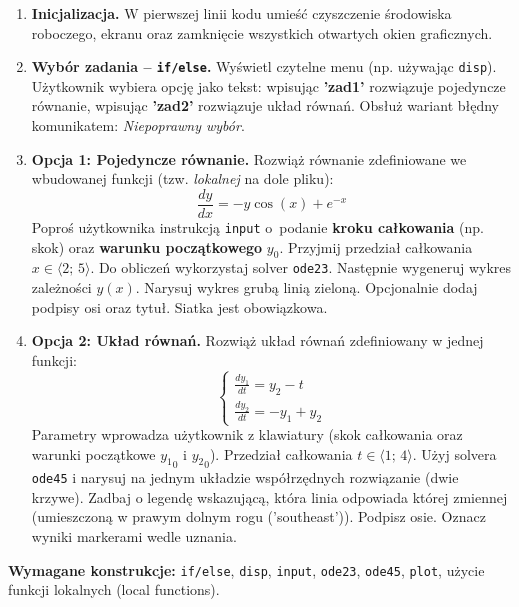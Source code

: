 \documentclass[a4paper,11pt]{article}
\begin{document}
\begin{enumerate}[leftmargin=*, label=\textbf{\arabic*.}, itemsep=2pt]

  \item \textbf{Inicjalizacja.}
    W pierwszej linii kodu umieść czyszczenie środowiska roboczego, ekranu oraz zamknięcie wszystkich otwartych okien graficznych.

  \item \textbf{Wybór zadania -- \texttt{if/else}.}
    Wyświetl czytelne menu (np. używając \texttt{disp}). Użytkownik wybiera opcję jako tekst: wpisując \textbf{'zad1'} rozwiązuje pojedyncze równanie, wpisując \textbf{'zad2'} rozwiązuje układ równań. Obsłuż wariant błędny komunikatem: \textit{Niepoprawny wybór}.

  \item \textbf{Opcja 1: Pojedyncze równanie.}
    Rozwiąż równanie zdefiniowane we wbudowanej funkcji (tzw. \textit{lokalnej} na dole pliku):
    \[ \frac{dy}{dx} = -y\cos(x) + e^{-x} \]
    Poproś użytkownika instrukcją \texttt{input} o~podanie \textbf{kroku całkowania} (np. skok) oraz \textbf{warunku początkowego} $y_0$. Przyjmij przedział całkowania $x \in \langle 2;\,5 \rangle$.
    Do obliczeń wykorzystaj solver \texttt{ode23}. Następnie wygeneruj wykres zależności $y(x)$. Narysuj wykres grubą linią zieloną. Opcjonalnie dodaj podpisy osi oraz tytuł. Siatka jest obowiązkowa.

  \item \textbf{Opcja 2: Układ równań.}
    Rozwiąż układ równań zdefiniowany w jednej funkcji:\\[-0.5em]
    \[
    \begin{cases}
      \frac{dy_1}{dt} = y_2 - t \\
      \frac{dy_2}{dt} = -y_1 + y_2
    \end{cases}
    \]
    Parametry wprowadza użytkownik z klawiatury (skok całkowania oraz warunki początkowe $ {y_1}_{0} $ i $ {y_2}_{0} $). Przedział całkowania $t \in \langle 1;\,4 \rangle$.
    Użyj solvera \texttt{ode45} i narysuj na jednym układzie współrzędnych rozwiązanie (dwie krzywe). Zadbaj o legendę wskazującą, która linia odpowiada której zmiennej (umieszczoną w prawym dolnym rogu ('southeast')). Podpisz osie. Oznacz wyniki markerami wedle uznania.

\end{enumerate}

\vspace{0.3cm}
\begin{ramka}
\textbf{Wymagane konstrukcje:}
\texttt{if/else}, \texttt{disp}, \texttt{input}, \texttt{ode23}, \texttt{ode45}, \texttt{plot}, użycie funkcji lokalnych (local functions).
\end{ramka}
\end{document}
